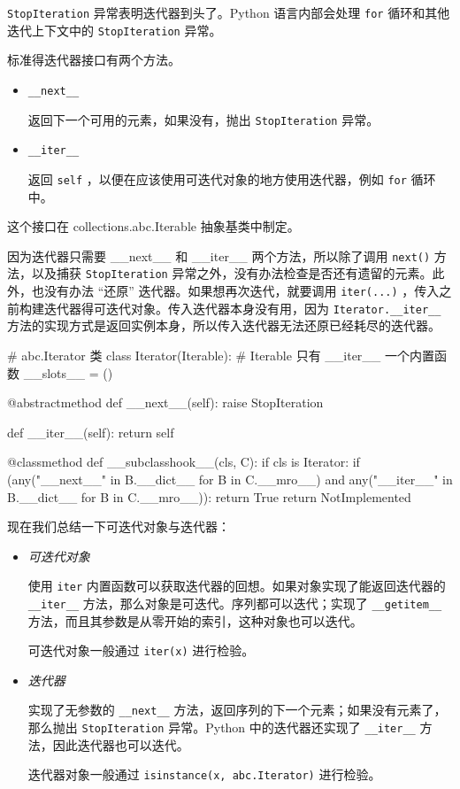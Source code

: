 \texttt{StopIteration} 异常表明迭代器到头了。Python 语言内部会处理 \texttt{for} 循环和其他迭代上下文中的 \texttt{StopIteration} 异常。

标准得迭代器接口有两个方法。
\begin{itemize}
    \item \texttt{\_\_next\_\_}
    
    返回下一个可用的元素，如果没有，抛出 \texttt{StopIteration} 异常。

    \item \texttt{\_\_iter\_\_}
    
     返回 \texttt{self} ，以便在应该使用可迭代对象的地方使用迭代器，例如 \texttt{for} 循环中。
\end{itemize}

这个接口在 collections.abc.Iterable 抽象基类中制定。

因为迭代器只需要 \_\_next\_\_ 和 \_\_iter\_\_ 两个方法，所以除了调用 \texttt{next()} 方法，以及捕获 \texttt{StopIteration} 异常之外，没有办法检查是否还有遗留的元素。此外，也没有办法 ``还原'' 迭代器。如果想再次迭代，就要调用 \texttt{iter(...)} ，传入之前构建迭代器得可迭代对象。传入迭代器本身没有用，因为 \texttt{Iterator.\_\_iter\_\_} 方法的实现方式是返回实例本身，所以传入迭代器无法还原已经耗尽的迭代器。
 
\begin{python}
# abc.Iterator 类
class Iterator(Iterable):   # Iterable 只有 __iter__ 一个内置函数
    __slots__ = ()

    @abstractmethod
    def __next__(self):
        raise StopIteration

    def __iter__(self):
        return self

    @classmethod
    def __subclasshook__(cls, C):
        if cls is Iterator:
            if (any("__next__" in B.__dict__ for B in C.__mro__) and
                any("__iter__" in B.__dict__ for B in C.__mro__)):
                return True
            return NotImplemented
\end{python}

现在我们总结一下可迭代对象与迭代器：
\begin{itemize}
    \item \textit{可迭代对象}
    
    使用 \texttt{iter} 内置函数可以获取迭代器的回想。如果对象实现了能返回迭代器的 \texttt{\_\_iter\_\_} 方法，那么对象是可迭代。序列都可以迭代；实现了 \texttt{\_\_getitem\_\_} 方法，而且其参数是从零开始的索引，这种对象也可以迭代。

    可迭代对象一般通过 \texttt{iter(x)} 进行检验。

    \item \textit{迭代器}
    
    实现了无参数的 \texttt{\_\_next\_\_} 方法，返回序列的下一个元素；如果没有元素了，那么抛出 \texttt{StopIteration} 异常。Python 中的迭代器还实现了 \texttt{\_\_iter\_\_} 方法，因此迭代器也可以迭代。

    迭代器对象一般通过 \texttt{isinstance(x, abc.Iterator)} 进行检验。
\end{itemize}

